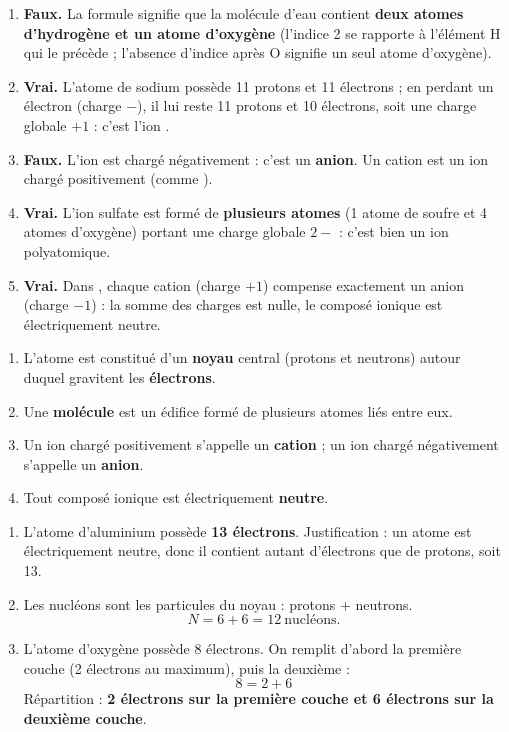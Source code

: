 \documentclass[11pt]{article}
\begin{document}
\begin{corrige}
\begin{enumerate}
\item \textbf{Faux.} La formule  signifie que la molécule d'eau contient \textbf{deux atomes d'hydrogène et un atome d'oxygène} (l'indice 2 se rapporte à l'élément H qui le précède ; l'absence d'indice après O signifie un seul atome d'oxygène).
\item \textbf{Vrai.} L'atome de sodium possède 11 protons et 11 électrons ; en perdant un électron (charge $-$), il lui reste 11 protons et 10 électrons, soit une charge globale $+1$ : c'est l'ion .
\item \textbf{Faux.} L'ion  est chargé négativement : c'est un \textbf{anion}. Un cation est un ion chargé positivement (comme ).
\item \textbf{Vrai.} L'ion sulfate  est formé de \textbf{plusieurs atomes} (1 atome de soufre et 4 atomes d'oxygène) portant une charge globale $2-$ : c'est bien un ion polyatomique.
\item \textbf{Vrai.} Dans , chaque cation  (charge $+1$) compense exactement un anion  (charge $-1$) : la somme des charges est nulle, le composé ionique est électriquement neutre.
\end{enumerate}
\end{corrige}

\begin{corrige}
\begin{enumerate}
\item L'atome est constitué d'un \textbf{noyau} central (protons et neutrons) autour duquel gravitent les \textbf{électrons}.
\item Une \textbf{molécule} est un édifice formé de plusieurs atomes liés entre eux.
\item Un ion chargé positivement s'appelle un \textbf{cation} ; un ion chargé négativement s'appelle un \textbf{anion}.
\item Tout composé ionique est électriquement \textbf{neutre}.
\end{enumerate}
\end{corrige}

\begin{corrige}
\begin{enumerate}
\item L'atome d'aluminium possède \textbf{13 électrons}. Justification : un atome est électriquement neutre, donc il contient autant d'électrons que de protons, soit 13.
\item Les nucléons sont les particules du noyau : protons + neutrons.
\[ N = 6 + 6 = 12 \ \text{nucléons.} \]
\item L'atome d'oxygène possède 8 électrons. On remplit d'abord la première couche (2 électrons au maximum), puis la deuxième :
\[ 8 = 2 + 6 \]
Répartition : \textbf{2 électrons sur la première couche et 6 électrons sur la deuxième couche}.
\end{enumerate}
\end{corrige}
\end{document}
